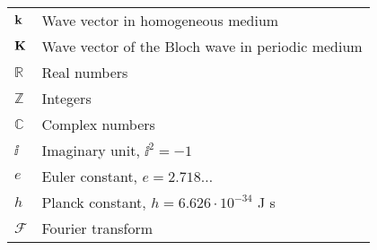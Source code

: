 \begin{table}[ht]
\begin{tabular}{ll}
${\mathbf{k}}$ 		& Wave vector in homogeneous medium\\
${\mathbf{K}}$ 		& Wave vector of the Bloch wave in periodic medium\\
$\mathbb{R}$		& Real numbers\\
$\mathbb{Z}$		& Integers\\
$\mathbb{C}$		& Complex numbers\\
$\ii$		& Imaginary unit, $\ii^2 = -1$\\
$e$ 		& Euler constant, $e = 2.718\ldots$\\
$h$ 		& Planck constant, $h = 6.626\cdot 10^{-34}$ J s\\
$\mathcal F$ 		& Fourier transform\\

 \bottomrule
 \end{tabular} \end{table}

